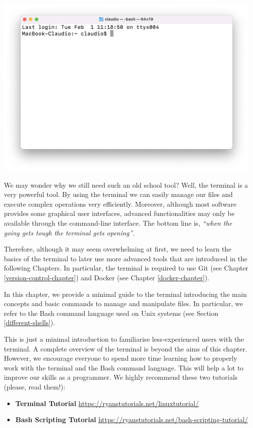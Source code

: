 \documentclass[
  11pt,
]{book}
\providecommand{\tightlist}{%
  \setlength{\itemsep}{0pt}\setlength{\parskip}{0pt}}
\begin{document}
\begin{center}\includegraphics[width=0.8\linewidth]{images/terminal/terminal} \end{center}

We may wonder why we still need such an old school tool? Well, the terminal is a very powerful tool. By using the terminal we can easily manage our files and execute complex operations very efficiently. Moreover, although most software provides some graphical user interfaces, advanced functionalities may only be available through the command-line interface. The bottom line is, \emph{``when the going gets tough the terminal gets opening''}.

Therefore, although it may seem overwhelming at first, we need to learn the basics of the terminal to later use more advanced tools that are introduced in the following Chapters. In particular, the terminal is required to use Git (see Chapter \ref{version-control-chapter}) and Docker (see Chapter \ref{docker-chapter}).

In this chapter, we provide a minimal guide to the terminal introducing the main concepts and basic commands to manage and manipulate files. In particular, we refer to the Bash command language used on Unix systems (see Section \ref{different-shells}).

This is just a minimal introduction to familiarise less-experienced users with the terminal. A complete overview of the terminal is beyond the aims of this chapter. However, we encourage everyone to spend more time learning how to properly work with the terminal and the Bash command language. This will help a lot to improve our skills as a programmer. We highly recommend these two tutorials (please, read them!):

\begin{itemize}
\tightlist
\item
  \textbf{Terminal Tutorial} \url{https://ryanstutorials.net/linuxtutorial/}
\item
  \textbf{Bash Scripting Tutorial} \url{https://ryanstutorials.net/bash-scripting-tutorial/}
\end{itemize}
\end{document}
